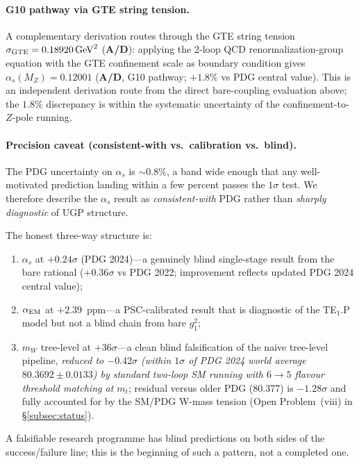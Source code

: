 \documentclass[11pt]{article}
\theoremstyle{remark}
\newcommand{\CatAD}{\textbf{A/D}}
\begin{document}
\paragraph{G10 pathway via GTE string tension.}
A complementary derivation routes through the GTE string tension $\sigma_{\rm GTE} = 0.18920\,\text{GeV}^2$ (\CatAD): applying the 2-loop QCD renormalization-group equation with the GTE confinement scale as boundary condition gives $\alpha_s(M_Z) = 0.12001$ (\CatAD, G10 pathway; $+1.8\%$ vs PDG central value).  This is an independent derivation route from the direct bare-coupling evaluation above; the $1.8\%$ discrepancy is within the systematic uncertainty of the confinement-to-$Z$-pole running.

\paragraph{Precision caveat (consistent-with vs.\ calibration vs.\ blind).}
The PDG uncertainty on $\alpha_s$ is $\sim 0.8\%$, a band wide enough that any well-motivated prediction landing within a few percent passes the $1\sigma$ test.  We therefore describe the $\alpha_s$ result as \emph{consistent-with} PDG rather than \emph{sharply diagnostic} of UGP structure.

\smallskip
The honest three-way structure is:
\begin{enumerate}[leftmargin=1.6em,itemsep=0.15em,topsep=0.2em,label=(\alph*)]
  \item $\alpha_s$ at $+0.24\sigma$ (PDG 2024)---a genuinely blind single-stage result from the bare rational ($+0.36\sigma$ vs PDG 2022; improvement reflects updated PDG 2024 central value);
  \item $\alpha_{\rm EM}$ at $+2.39$~ppm---a PSC-calibrated result that is diagnostic of the TE$_1$.P model but not a blind chain from bare $g_1^2$;
  \item $m_W$ tree-level at $+36\sigma$---a clean blind falsification of the naive tree-level pipeline, \emph{reduced to $-0.42\sigma$ (within $1\sigma$ of PDG 2024 world average $80.3692 \pm 0.0133$) by standard two-loop SM running with $6{\to}5$ flavour threshold matching at $m_t$}; residual versus older PDG (80.377) is $-1.28\sigma$ and fully accounted for by the SM/PDG W-mass tension (Open Problem~(viii) in \S\ref{subsec:status}).
\end{enumerate}

\smallskip
A falsifiable research programme has blind predictions on both sides of the success/failure line; this is the beginning of such a pattern, not a completed one.
\end{document}

